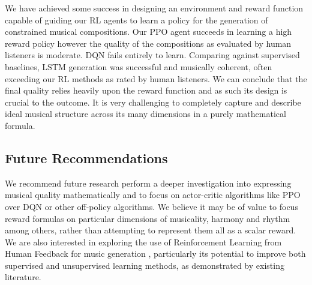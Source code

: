 \documentclass{article}
\begin{document}
We have achieved some success in designing an environment and reward function capable of guiding our RL agents to learn a policy for the generation of constrained musical compositions. Our PPO agent succeeds in learning a high reward policy however the quality of the compositions as evaluated by human listeners is moderate. DQN fails entirely to learn. Comparing against supervised baselines, LSTM generation was successful and musically coherent, often exceeding our RL methods as rated by human listeners. We can conclude that the final quality relies heavily upon the reward function and as such its design is crucial to the outcome. It is very challenging to completely capture and describe ideal musical structure across its many dimensions in a purely mathematical formula.

\subsection{Future Recommendations}

We recommend future research perform a deeper investigation into expressing musical quality mathematically and to focus on actor-critic algorithms like PPO over DQN or other off-policy algorithms. We believe it may be of value to focus reward formulas on particular dimensions of musicality, harmony and rhythm among others, rather than attempting to represent them all as a scalar reward. We are also interested in exploring the use of Reinforcement Learning from Human Feedback for music generation \citep{music-rlhf}, particularly its potential to improve both supervised and unsupervised learning methods, as demonstrated by existing literature.
\end{document}
